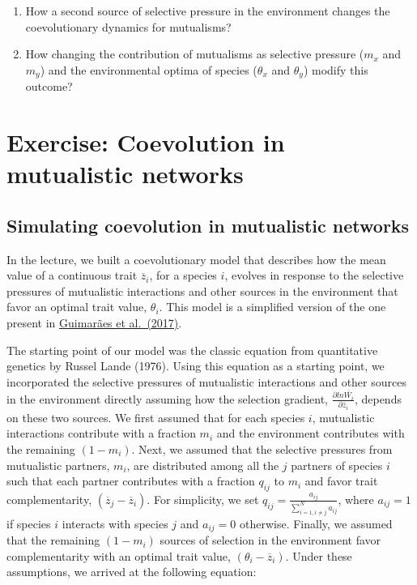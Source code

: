 \documentclass[
]{book}
\begin{document}
\begin{enumerate}
\def\labelenumi{\arabic{enumi}.}
\item
  How a second source of selective pressure in the environment changes the coevolutionary dynamics for mutualisms?
\item
  How changing the contribution of mutualisms as selective pressure (\(m_{x}\) and \(m_{y}\)) and the environmental optima of species (\(\theta_{x}\) and \(\theta_{y}\)) modify this outcome?
\end{enumerate}

\hypertarget{exercise-coevolution-in-mutualistic-networks}{%
\chapter{Exercise: Coevolution in mutualistic networks}\label{exercise-coevolution-in-mutualistic-networks}}

\hypertarget{simulating-coevolution-in-mutualistic-networks}{%
\section{Simulating coevolution in mutualistic networks}\label{simulating-coevolution-in-mutualistic-networks}}

In the lecture, we built a coevolutionary model that describes how the mean value of a continuous trait \(\overline{z}_{i}\), for a species \(i\), evolves in response to the selective pressures of mutualistic interactions and other sources in the environment that favor an optimal trait value, \(\theta_{i}\). This model is a simplified version of the one present in \href{https://www.nature.com/articles/nature24273}{Guimarães et al.~(2017)}.

The starting point of our model was the classic equation from quantitative genetics by Russel Lande (1976). Using this equation as a starting point, we incorporated the selective pressures of mutualistic interactions and other sources in the environment directly assuming how the selection gradient, \(\frac{\partial ln\overline{W_i}}{\partial \overline{z}_i}\), depends on these two sources. We first assumed that for each species \(i\), mutualistic interactions contribute with a fraction \(m_{i}\) and the environment contributes with the remaining \((1-m_{i})\). Next, we assumed that the selective pressures from mutualistic partners, \(m_{i}\), are distributed among all the \(j\) partners of species \(i\) such that each partner contributes with a fraction \(q_{ij}\) to \(m_{i}\) and favor trait complementarity, \((\overline{z}_j-\overline{z}_i)\). For simplicity, we set \(q_{ij}=\frac{a_{ij}}{\sum_{i=1, i\neq j}^{N}a_{ij}}\), where \(a_{ij}=1\) if species \(i\) interacts with species \(j\) and \(a_{ij}=0\) otherwise. Finally, we assumed that the remaining \((1-m_{i})\) sources of selection in the environment favor complementarity with an optimal trait value, \((\theta_{i}-\overline{z}_i)\). Under these assumptions, we arrived at the following equation:
\end{document}
